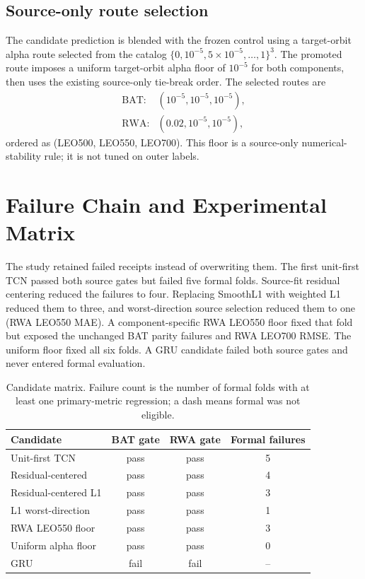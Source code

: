 \documentclass[conference]{IEEEtran}
\begin{document}
\subsection{Source-only route selection}
The candidate prediction is blended with the frozen control using a target-orbit alpha route selected from the catalog $\{0,10^{-5},5\times10^{-5},\ldots,1\}^3$. The promoted route imposes a uniform target-orbit alpha floor of $10^{-5}$ for both components, then uses the existing source-only tie-break order. The selected routes are
\begin{align*}
\text{BAT}:&(10^{-5},10^{-5},10^{-5}),\\
\text{RWA}:&(0.02,10^{-5},10^{-5}),
\end{align*}
ordered as (LEO500, LEO550, LEO700). This floor is a source-only numerical-stability rule; it is not tuned on outer labels.

\section{Failure Chain and Experimental Matrix}
The study retained failed receipts instead of overwriting them. The first unit-first TCN passed both source gates but failed five formal folds. Source-fit residual centering reduced the failures to four. Replacing SmoothL1 with weighted L1 reduced them to three, and worst-direction source selection reduced them to one (RWA LEO550 MAE). A component-specific RWA LEO550 floor fixed that fold but exposed the unchanged BAT parity failures and RWA LEO700 RMSE. The uniform floor fixed all six folds. A GRU candidate failed both source gates and never entered formal evaluation.

\begin{table}[t]
\centering
\caption{Candidate matrix. Failure count is the number of formal folds with at least one primary-metric regression; a dash means formal was not eligible.}
\label{tab:matrix}
\scriptsize
\begin{tabular}{lccc}
\toprule
Candidate & BAT gate & RWA gate & Formal failures \\
\midrule
Unit-first TCN & pass & pass & 5\\
Residual-centered & pass & pass & 4\\
Residual-centered L1 & pass & pass & 3\\
L1 worst-direction & pass & pass & 1\\
RWA LEO550 floor & pass & pass & 3\\
Uniform alpha floor & pass & pass & 0\\
GRU & fail & fail & --\\
\bottomrule
\end{tabular}
\end{table}
\end{document}
